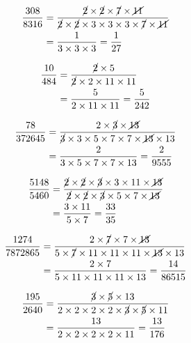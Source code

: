{{\item\begin{align*}
    \frac{308}{8316} &=
    \frac{\cancel{2} \times \cancel{2} \times \cancel{7} \times \cancel{11}}
    {\cancel{2} \times \cancel{2} \times 3 \times 3 \times 3 \times \cancel{7} \times \cancel{11}}\\ &=
    \frac{1}
    {3 \times 3 \times 3} =
    \frac{1}{27}
    \end{align*}

\item\begin{align*}
    \frac{10}{484} &=
    \frac{\cancel{2} \times 5}
    {\cancel{2} \times 2 \times 11 \times 11}\\ &=
    \frac{5}
    {2 \times 11 \times 11} =
    \frac{5}{242}
    \end{align*}

\item\begin{align*}
    \frac{78}{372645} &=
    \frac{2 \times \cancel{3} \times \cancel{13}}
    {\cancel{3} \times 3 \times 5 \times 7 \times 7 \times \cancel{13} \times 13}\\ &=
    \frac{2}
    {3 \times 5 \times 7 \times 7 \times 13} =
    \frac{2}{9555}
    \end{align*}

\item\begin{align*}
    \frac{5148}{5460} &=
    \frac{\cancel{2} \times \cancel{2} \times \cancel{3} \times 3 \times 11 \times \cancel{13}}
    {\cancel{2} \times \cancel{2} \times \cancel{3} \times 5 \times 7 \times \cancel{13}}\\ &=
    \frac{3 \times 11}
    {5 \times 7} =
    \frac{33}{35}
    \end{align*}

\item\begin{align*}
    \frac{1274}{7872865} &=
    \frac{2 \times \cancel{7} \times 7 \times \cancel{13}}
    {5 \times \cancel{7} \times 11 \times 11 \times 11 \times \cancel{13} \times 13}\\ &=
    \frac{2 \times 7}
    {5 \times 11 \times 11 \times 11 \times 13} =
    \frac{14}{86515}
    \end{align*}

\item\begin{align*}
    \frac{195}{2640} &=
    \frac{\cancel{3} \times \cancel{5} \times 13}
    {2 \times 2 \times 2 \times 2 \times \cancel{3} \times \cancel{5} \times 11}\\ &=
    \frac{13}
    {2 \times 2 \times 2 \times 2 \times 11} =
    \frac{13}{176}
    \end{align*}

}}
